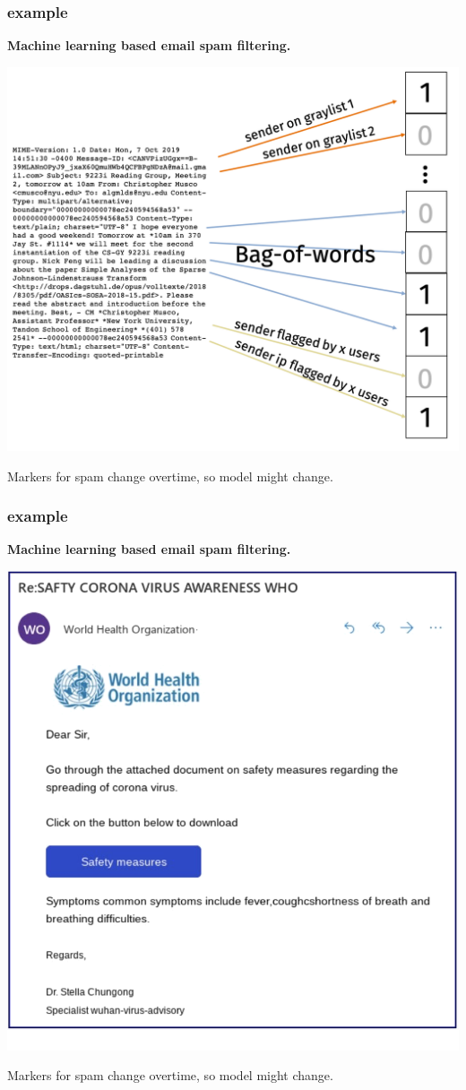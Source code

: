 \documentclass[compress]{beamer}
\begin{document}
\begin{frame}
	\frametitle{example}
		\begin{center}
		\textbf{Machine learning based email spam filtering.}
	\end{center}
	\begin{center}
		\includegraphics[width=.5\textwidth]{spam_features.png}
	\end{center}
Markers for spam change overtime, so model might change.
\end{frame}

\begin{frame}
	\frametitle{example}
	\begin{center}
		\textbf{Machine learning  based email spam filtering.}
	\end{center}
	\begin{center}
		\includegraphics[width=.5\textwidth]{covid_spam.png}
	\end{center}
	Markers for spam change overtime, so model might change.
\end{frame}
\end{document}
